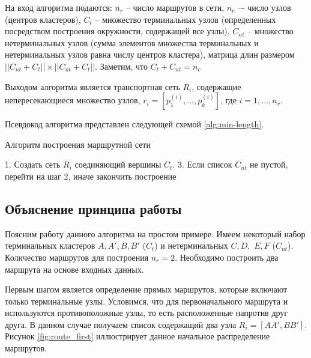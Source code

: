 На вход алгоритма подаются: \( n_r \) -- число маршрутов в сети, \( n_c \) –- число узлов (центров 
кластеров), \( C_t \) – множество терминальных узлов (определенных посредством построения окружности, 
содержащей все узлы), \( C_{nt} \) -- множество нетерминальных узлов (сумма элементов множества терминальных 
и нетерминальных узлов равна числу центров кластера), матрица длин размером 
\( ||{C_{nt}} + {C_{t}}|| \times ||{C_{nt}} + {C_{t}}|| \). Заметим, что \( C_t + C_{nt} = n_c \)

Выходом алгоритма является транспортная сеть \( R_i \), содержащие непересекающиеся множество узлов, 
\( r_{i} = [p_{1}^{(i)}, \dots, p_{k}^{(i)}] \), где \( i = 1, \dots, n_r \). 

Псевдокод алгоритма представлен следующей схемой \ref{alg:min-length}.
\begin{algorithm}[ht!]
    \caption{Алгоритм построения маршрутной сети}
    1. Создать сеть \( R_i \) соединяющий вершины \( C_t \). 
    3. Если список \( C_{nt} \) не пустой, перейти на шаг 2, иначе закончить построение\;
    \label{alg:min-length}
\end{algorithm}

\subsection{Объяснение принципа работы}
Поясним работу данного алгоритма на простом примере. Имеем некоторый набор терминальных кластеров 
\( A, A', B, B' \) (\( C_t \)) и нетерминальных \( C, D, \) \( E, F \) (\( C_{nt} \)). Количество маршрутов 
для построения \( n_r = 2 \). Необходимо построить два маршрута на основе входных данных.

Первым шагом является определение прямых маршрутов, которые включают только терминальные узлы. Условимся, 
что для первоначального маршрута и используются противоположные узлы, то есть расположенные напротив друг 
друга. В данном случае получаем список содержащий два узла \( R_i = [AA', BB'] \). Рисунок 
\ref{fig:route_first} иллюстрирует данное начальное распределение маршрутов.

